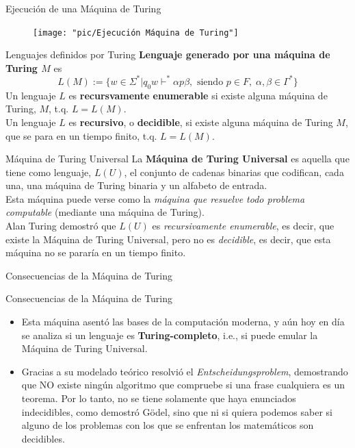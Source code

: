 \documentclass[aspectratio=169]{beamer}
\begin{document}
\begin{frame}{Ejecución de una Máquina de Turing}
\begin{figure}
	\centering
	\texttt{[image: "pic/Ejecución Máquina de Turing"]}
\end{figure}

\end{frame}


\begin{frame}{Lenguajes definidos por Turing}
\textbf{Lenguaje generado por una máquina de Turing $M$} es
$$L(M) := \{w\in \Sigma^*| q_0w\vdash^*\alpha p \beta, \text{ siendo } p\in F,\; \alpha, \beta \in \Gamma^*\}$$\pause
Un lenguaje $L$ es \textbf{recursvamente enumerable} si existe alguna máquina de Turing, $M$, t.q. $L = L(M)$.\\\vspace{12pt}\pause
Un lenguaje $L$ es \textbf{recursivo}, o \textbf{decidible}, si existe alguna máquina de Turing $M$, que se para en un tiempo finito, t.q. $L=L(M)$.
\end{frame}

\begin{frame}{Máquina de Turing Universal}
	La \textbf{Máquina de Turing Universal} es aquella que tiene como lenguaje, $L(U)$, el conjunto de cadenas binarias que codifican, cada una, una máquina de Turing binaria y un alfabeto de entrada.\\\vspace{12pt}\pause
	Esta máquina puede verse como la \textit{máquina que resuelve todo problema computable} (mediante una máquina de Turing).\\\vspace{12pt}\pause
	Alan Turing demostró que $L(U)$ es \textit{recursivamente enumerable}, es decir, que existe la Máquina de Turing Universal, pero no es \textit{decidible}, es decir, que esta máquina no se pararía en un tiempo finito.
\end{frame}

\begin{frame}{Consecuencias de la Máquina de Turing}
	\begin{block}{Consecuencias de la Máquina de Turing}
		\begin{itemize}
			\item Esta máquina asentó las bases de la computación moderna, y aún hoy en día se analiza si un lenguaje es \textbf{Turing-completo}, i.e., si puede emular la Máquina de Turing Universal.\pause
			\item Gracias a su modelado teórico resolvió el \textit{Entscheidungsproblem}, demostrando que NO existe ningún algoritmo que compruebe si una frase cualquiera es un teorema. Por lo tanto, no se tiene solamente que haya enunciados indecidibles, como demostró Gödel, sino que ni si quiera podemos saber si alguno de los problemas con los que se enfrentan los matemáticos son decidibles.
		\end{itemize}
	\end{block}
\end{frame}
\end{document}
